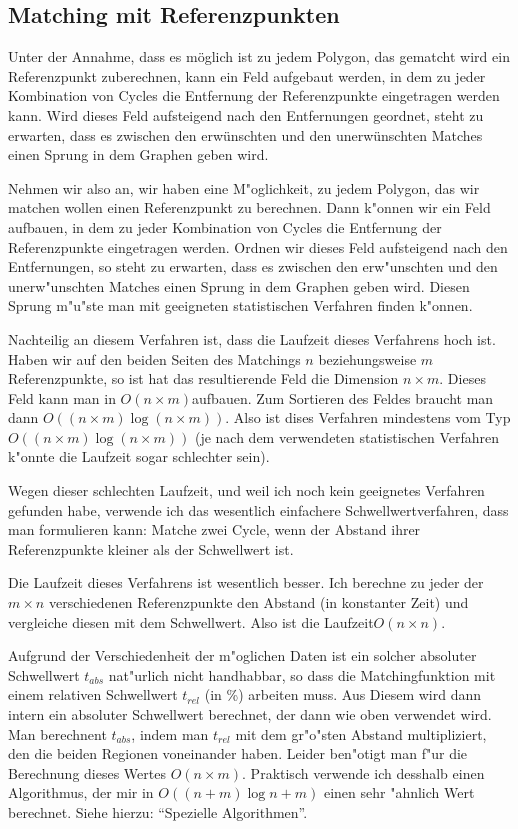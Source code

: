 \subsection{Matching mit Referenzpunkten}

Unter der Annahme, dass es möglich ist zu jedem Polygon, das gematcht wird ein Referenzpunkt zuberechnen, kann ein Feld aufgebaut werden, in dem zu jeder Kombination von Cycles die Entfernung der Referenzpunkte eingetragen werden kann. Wird dieses Feld aufsteigend nach den Entfernungen geordnet, steht zu erwarten,
dass es zwischen den erwünschten und den unerwünschten Matches einen Sprung in dem Graphen geben wird. 

Nehmen wir also an, wir haben eine M"oglichkeit, zu jedem Polygon, das wir matchen wollen einen Referenzpunkt zu berechnen. Dann k"onnen wir ein Feld aufbauen, in dem zu jeder Kombination von Cycles die Entfernung der Referenzpunkte eingetragen werden. Ordnen wir dieses Feld aufsteigend nach den Entfernungen, so steht zu erwarten, dass es zwischen den erw"unschten und den unerw"unschten Matches einen Sprung in dem Graphen geben wird. Diesen Sprung m"u"ste man mit geeigneten statistischen Verfahren finden k"onnen. 

Nachteilig an diesem Verfahren ist, dass die Laufzeit dieses Verfahrens hoch ist. Haben wir auf den beiden Seiten des Matchings $n$ beziehungsweise $m$ Referenzpunkte, so ist hat das resultierende Feld die Dimension $n\times m$. Dieses Feld kann man in $O(n\times m)$aufbauen. Zum Sortieren des Feldes braucht man dann $O((n\times m)\log(n\times m))$. Also ist dises Verfahren mindestens vom Typ $O((n\times m)\log(n\times m))$ (je nach dem verwendeten statistischen Verfahren k"onnte die Laufzeit sogar schlechter sein).

Wegen dieser schlechten Laufzeit, und weil ich noch kein geeignetes Verfahren gefunden habe, verwende ich das wesentlich einfachere Schwellwertverfahren, dass man formulieren kann: Matche zwei Cycle, wenn der Abstand ihrer Referenzpunkte kleiner als der Schwellwert ist. 

Die Laufzeit dieses Verfahrens ist wesentlich besser. Ich berechne zu jeder der $m\times n$ verschiedenen  Referenzpunkte den Abstand (in konstanter Zeit) und vergleiche diesen mit dem Schwellwert. Also ist die Laufzeit$O(n\times n)$.

Aufgrund der Verschiedenheit der m"oglichen Daten ist ein solcher absoluter Schwellwert $t_{abs}$ nat"urlich nicht handhabbar, so dass die Matchingfunktion mit einem relativen Schwellwert $t_{rel}$ (in \%) arbeiten muss. Aus Diesem wird dann intern ein absoluter Schwellwert berechnet, der dann wie oben verwendet wird. Man berechnent $t_{abs}$, indem man $t_{rel}$ mit dem gr"o"sten Abstand multipliziert, den die beiden Regionen voneinander haben. Leider ben"otigt man f"ur die Berechnung dieses Wertes $O(n\times m)$. Praktisch verwende ich desshalb einen Algorithmus, der mir in $O((n+m)\log{n+m})$ einen sehr "ahnlich Wert berechnet. Siehe hierzu: "`Spezielle Algorithmen"'.
